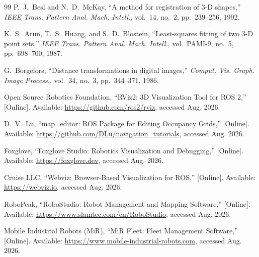\documentclass{IEEE_lsens}
\begin{document}
\begin{thebibliography}{99}
P.~J.~Besl and N.~D.~McKay, ``A method for registration of 3-D shapes,'' \emph{IEEE Trans. Pattern Anal. Mach. Intell.}, vol.~14, no.~2, pp.\ 239--256, 1992.

K.~S.~Arun, T.~S.~Huang, and S.~D.~Blostein, ``Least-squares fitting of two 3-D point sets,'' \emph{IEEE Trans. Pattern Anal. Mach. Intell.}, vol.\ PAMI-9, no.~5, pp.\ 698--700, 1987.

G.~Borgefors, ``Distance transformations in digital images,'' \emph{Comput. Vis. Graph. Image Process.}, vol.~34, no.~3, pp.\ 344--371, 1986.

Open Source Robotics Foundation, ``RViz2: 3D Visualization Tool for ROS 2,'' [Online]. Available: \url{https://github.com/ros2/rviz}, accessed Aug. 2026.

D.~V.~Lu, ``map\_editor: ROS Package for Editing Occupancy Grids,'' [Online]. Available: \url{https://github.com/DLu/navigation_tutorials}, accessed Aug. 2026.

Foxglove, ``Foxglove Studio: Robotics Visualization and Debugging,'' [Online]. Available: \url{https://foxglove.dev}, accessed Aug. 2026.

Cruise LLC, ``Webviz: Browser-Based Visualization for ROS,'' [Online]. Available: \url{https://webviz.io}, accessed Aug. 2026.

RoboPeak, ``RoboStudio: Robot Management and Mapping Software,'' [Online]. Available: \url{https://www.slamtec.com/en/RoboStudio}, accessed Aug. 2026.

Mobile Industrial Robots (MiR), ``MiR Fleet: Fleet Management Software,'' [Online]. Available: \url{https://www.mobile-industrial-robots.com}, accessed Aug. 2026.

\end{thebibliography}
\end{document}
